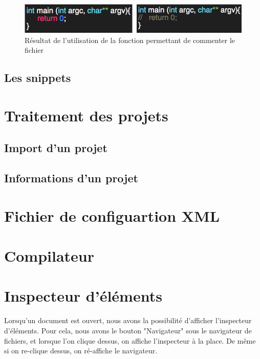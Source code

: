 \documentclass[a4paper,12pt]{article}
\begin{document}
	\begin{figure}[h!]
		\begin{center}
			\includegraphics[scale=0.8]{images/imgs_edit/resultat_commentaire}
			\caption{Résultat de l'utilisation de la fonction permettant de commenter le fichier}
		\end{center}
	\end{figure}
	
\subsection{Les snippets}
	
\section{Traitement des projets}

	\subsection{Import d'un projet}
	
	\subsection{Informations d'un projet}
	
	
\section{Fichier de configuartion XML}


\section{Compilateur}

\section{Inspecteur d'éléments}

	Lorsqu'un document est ouvert, nous avons la possibilité d'afficher l'inspecteur d'éléments. Pour cela, nous avons le bouton "Navigateur" sous le navigateur de fichiers, et lorsque l'on clique dessus, on affiche l'inspecteur à la place. De même si on re-clique dessus, on ré-affiche le navigateur.
	
\end{document}
